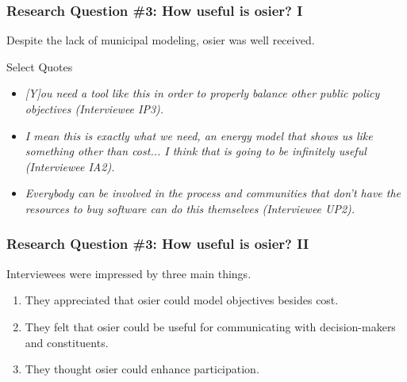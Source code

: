 \begin{frame}
    \frametitle{Research Question \#3: How useful is \gls{osier}? I}

    Despite the lack of municipal modeling, \gls{osier} was well received.

    \begin{block}{Select Quotes}
        \begin{itemize}[<+,3>]
            \item   \textit{[Y]ou need a tool like this in order to properly balance other
                        public policy objectives (Interviewee IP3).}  
            \item \textit{I mean this is exactly what we need, an energy model that shows us
                        like something other than cost... I think that is going to be infinitely
                        useful (Interviewee IA2).}
            \item \textit{Everybody can be involved in the process and communities that don’t
                        have the resources to buy software can do this themselves (Interviewee UP2).}
        \end{itemize}
    \end{block}
\end{frame}

\begin{frame}
    \frametitle{Research Question \#3: How useful is \gls{osier}? II}
    Interviewees were impressed by three main things. 
    \begin{enumerate}[<+->]
        \item They appreciated that \gls{osier} could model objectives besides cost.
        \item They felt that \gls{osier} could be useful for communicating with decision-makers and constituents.
        \item They thought \gls{osier} could enhance participation.
    \end{enumerate}
    
\end{frame}

